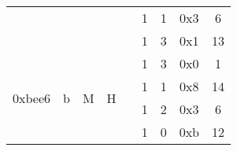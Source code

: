 \documentclass[11pt]{homework}
\newcommand{\xmark}{\ding{55}}%
\begin{document}
\begin{arabicparts}
{\begin{tabular}{|c|c|c|c|c|c|c|c|c|}
            \cline{6-9}
                                     &                                                                        &                                                                   &                                                                    &                                                                      & 1                        & 1         & 0x3 & 6             \\
            \cline{6-9}
                                     &                                                                        &                                                                   &                                                                    &                                                                      & 1                        & 3         & 0x1 & 13            \\
            \hline
            \multirow{4}{*}{0xbee6}  & \multirow{4}{*}{b}                                                     & \multirow{4}{*}{M}                                                & \multirow{4}{*}{H}                                                 & \multirow{4}{*}{\xmark}                                              & 1                        & 3         & 0x0 & 1             \\
            \cline{6-9}
                                     &                                                                        &                                                                   &                                                                    &                                                                      & 1                        & 1         & 0x8 & 14            \\
            \cline{6-9}
                                     &                                                                        &                                                                   &                                                                    &                                                                      & 1                        & 2         & 0x3 & 6             \\
            \cline{6-9}
                                     &                                                                        &                                                                   &                                                                    &                                                                      & 1                        & 0         & 0xb & 12            \\

\end{tabular}}
\end{arabicparts}
\end{document}
